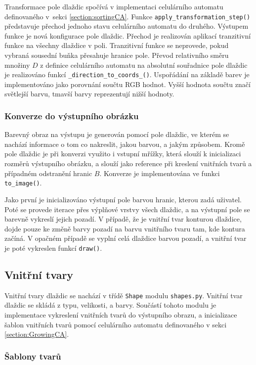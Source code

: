Transformace pole dlaždic spočívá v implementaci celulárního automatu definovaného v~sekci \ref{section:sortingCA}. Funkce \verb|apply_transformation_step()| představuje přechod jednoho stavu celulárního automatu do druhého. Výstupem funkce je nová konfigurace pole dlaždic. Přechod je realizován aplikací tranzitivní funkce na všechny dlaždice v poli. Tranzitivní funkce se neprovede, pokud vybraná sousední buňka přesahuje hranice pole. Převod relativního směru množiny $D$ z definice celulárního automatu na absolutní souřadnice pole dlaždic je realizováno funkcí \verb|_direction_to_coords_()|. Uspořádání na základě barev je implementováno jako porovnání součtu RGB hodnot. Vyšší hodnota součtu značí světlejší barvu, tmavší barvy reprezentují nižší hodnoty.

\subsubsection*{Konverze do výstupního obrázku}

Barevný obraz na výstupu je generován pomocí pole dlaždic, ve kterém se nachází informace o tom co nakreslit, jakou barvou, a jakým způsobem. Kromě pole dlaždic je při konverzi využito i vstupní mřížky, která slouží k inicializaci rozměrů výstupního obrázku, a slouží jako reference při kreslení vnitřních tvarů a případném odstranění hranic $B$. Konverze je implementována ve funkci \verb|to_image()|.

Jako první je inicializováno výstupní pole barvou hranic, kterou zadá uživatel. Poté se provede iterace přes výplňové vrstvy všech dlaždic, a na výstupní pole se barevně vykreslí jejich pozadí. V případě, že je vnitřní tvar konturou dlaždice, dojde pouze ke změně barvy pozadí na barvu vnitřního tvaru tam, kde kontura začíná. V opačném případě se vyplní celá dlaždice barvou pozadí, a vnitřní tvar je poté vykreslen funkcí \verb|draw()|. 


\subsection*{Vnitřní tvary}

Vnitřní tvary dlaždic se nachází v třídě \verb|Shape| modulu \verb|shapes.py|. Vnitřní tvar dlaždic se skládá z typu, velikosti, a barvy.
Součástí tohoto modulu je implementace vykreslení vnitřních tvarů do výstupního obrazu, a inicializace šablon vnitřních tvarů pomocí celulárního automatu definovaného v sekci \ref{section:GrowingCA}.

\subsubsection*{Šablony tvarů}

